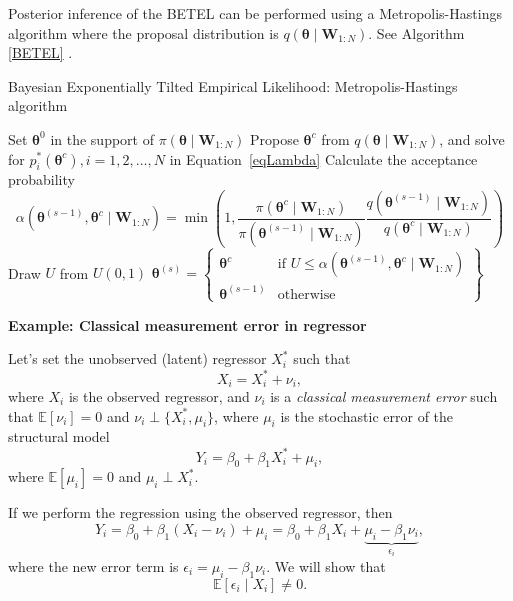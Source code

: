 Posterior inference of the BETEL can be performed using a Metropolis-Hastings algorithm where the proposal distribution is $q(\boldsymbol{\theta}\mid \mathbf{W}_{1:N})$. See Algorithm \ref{BETEL} \cite{chib2018moment}.

\begin{algorithm}
	\caption{Bayesian Exponentially Tilted Empirical Likelihood: Metropolis-Hastings algorithm}\label{BETEL}
	\begin{algorithmic}[1]
		\State Set $\boldsymbol{\theta}^0$ in the support of $\pi(\boldsymbol{\theta}\mid \mathbf{W}_{1:N})$ 
			\State Propose $\boldsymbol{\theta}^c$ from $q(\boldsymbol{\theta}\mid \mathbf{W}_{1:N})$, and solve for $p_i^{*}(\boldsymbol{\theta}^c), i=1,2,\dots,N$ in Equation~\ref{eqLambda} 
			\State Calculate the acceptance probability
			\[
			\alpha(\boldsymbol{\theta}^{(s-1)},\boldsymbol{\theta}^c\mid \mathbf{W}_{1:N})=\min\left(1,\frac{\pi(\boldsymbol{\theta}^{c}\mid \mathbf{W}_{1:N})}{\pi(\boldsymbol{\theta}^{(s-1)}\mid \mathbf{W}_{1:N})}\frac{q(\boldsymbol{\theta}^{(s-1)}\mid \mathbf{W}_{1:N})}{q(\boldsymbol{\theta}^{c}\mid \mathbf{W}_{1:N})}\right)
			\]
			\State Draw $U$ from $U(0,1)$
			\State $\boldsymbol{\theta}^{(s)}=\begin{Bmatrix}
			\boldsymbol{\theta}^{c} & \text{if }U\leq \alpha(\boldsymbol{\theta}^{(s-1)},\boldsymbol{\theta}^c\mid \mathbf{W}_{1:N})\\
			 \boldsymbol{\theta}^{(s-1)} & \text{otherwise}
		\end{Bmatrix}$
		\EndFor  
	\end{algorithmic}
\end{algorithm}

\textbf{Example: Classical measurement error in regressor}

Let's set the unobserved (latent) regressor $X_i^*$ such that
\[
X_i = X_i^* + \nu_i,
\]
where $X_i$ is the observed regressor, and $\nu_i$ is a \textit{classical measurement error} such that 
$\mathbb{E}[\nu_i]=0$ and $\nu_i \perp \{X_i^*,\mu_i\}$, where $\mu_i$ is the stochastic error of the structural model
\[
Y_i=\beta_0+\beta_1X_i^*+\mu_i,
\] 
where $\mathbb{E}[\mu_i]=0$ and $\mu_i\perp X_i^*$.

If we perform the regression using the observed regressor, then
\[
Y_i=\beta_0+\beta_1(X_i-\nu_i)+\mu_i
=\beta_0+\beta_1X_i+\underbrace{\mu_i-\beta_1\nu_i}_{\epsilon_i},
\]
where the new error term is $\epsilon_i=\mu_i-\beta_1\nu_i$. We will show that
\[
\mathbb{E}[\epsilon_i\mid X_i]\neq 0.
\]


